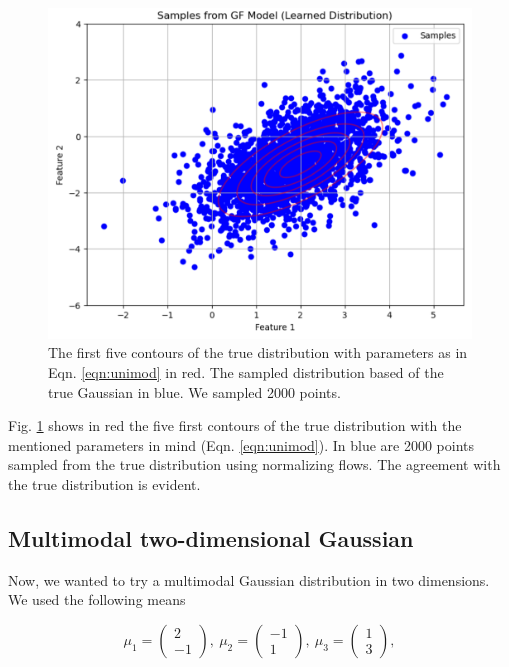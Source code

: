 \documentclass[
nofootinbib,
 amsmath,amssymb,
 aps,
]{revtex4-2}
\begin{document}
\newpage

\begin{figure}[h!]
\includegraphics[scale=0.60]{Plots/nf_2d_gaus_2000.png}
\caption{\label{fig:nf_2d_gaus_2000} The first five contours of the true distribution with parameters as in Eqn. \ref{eqn:unimod} in red. The sampled distribution based of the true Gaussian in blue. We sampled 2000 points.}
\end{figure}

Fig. \ref{fig:nf_2d_gaus_2000} shows in red the five first contours of the true distribution with the mentioned parameters in mind (Eqn. \ref{eqn:unimod}). In blue are 2000 points sampled from the true distribution using normalizing flows. The agreement with the true distribution is evident.


\subsection{Multimodal two-dimensional Gaussian}
Now, we wanted to try a multimodal Gaussian distribution in two dimensions. We used the following means

\begin{equation}
    \mu_1 = \begin{pmatrix} 2 \\ -1 \end{pmatrix},\ \mu_2 = \begin{pmatrix} -1 \\ 1 \end{pmatrix},\ \mu_3 = \begin{pmatrix} 1 \\ 3 \end{pmatrix},
\label{eqn:multimod_mean}
\end{equation}
\end{document}
